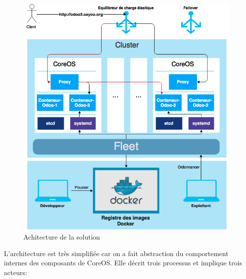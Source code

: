 \begin{onehalfspace}
\begin{figure}[H]
\centering
\includegraphics [scale=0.7]{chapitre4/assets/architecture}
\caption{Achitecture de la solution}
\label{fig:architecture}
\end{figure}

L'architecture est très simplifiée car on a fait abstraction du comportement internes des composants de CoreOS. Elle décrit trois processus et implique trois acteurs:



\end{onehalfspace}

